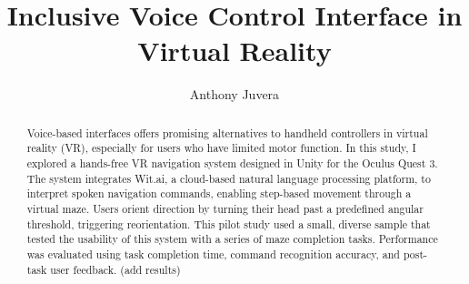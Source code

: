 \documentclass[manuscript, screen, review]{acmart}
\begin{document}
\title{Inclusive Voice Control Interface in Virtual Reality}

\author{Anthony Juvera}



\begin{abstract}
  Voice-based interfaces offers promising alternatives to handheld controllers in virtual reality (VR), especially for users who have limited motor function. In this study, I explored a hands-free VR navigation system designed in Unity for the Oculus Quest 3. The system integrates Wit.ai, a cloud-based natural language processing platform, to interpret spoken navigation commands, enabling step-based movement through a virtual maze. Users orient direction by turning their head past a predefined angular threshold, triggering reorientation. This pilot study used a small, diverse sample that tested the usability of this system with a series of maze completion tasks. Performance was evaluated using task completion time, command recognition accuracy, and post-task user feedback. (add results)
\end{abstract}




\end{document}
